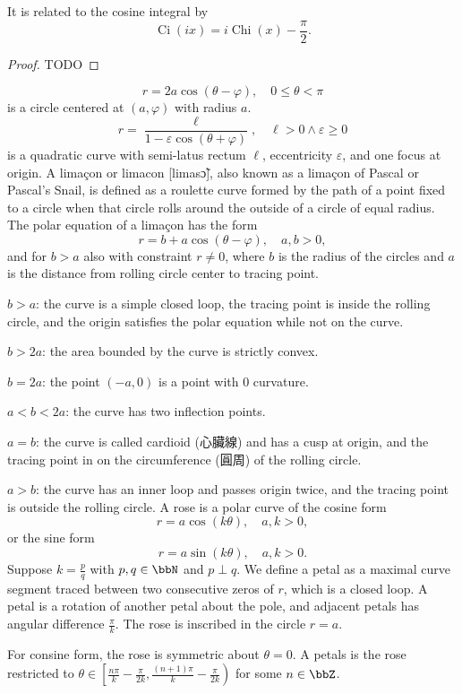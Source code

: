 It is related to the cosine integral by
\[\operatorname{Ci}(ix)=i\operatorname{Chi}(x)-\frac{\pi}{2}.\]
\begin{proof}
TODO
\end{proof}
\[r=2a\cos(\theta-\varphi),\quad 0\le\theta<\pi\]
is a circle centered at $(a,\varphi)$ with radius $a$.
\[r=\frac{\ell}{1-\varepsilon\cos(\theta+\varphi)},\quad\ell>0\land\varepsilon\geq0\]
is a quadratic curve with semi-latus rectum $\ell$, eccentricity $\varepsilon$, and one focus at origin.
A limaçon or limacon [limasɔ̃], also known as a limaçon of Pascal or Pascal's Snail, is defined as a roulette curve formed by the path of a point fixed to a circle when that circle rolls around the outside of a circle of equal radius. The polar equation of a limaçon has the form
\[r=b+a\cos(\theta-\varphi),\quad a,b>0,\]
and for $b>a$ also with constraint $r\neq 0$, where $b$ is the radius of the circles and $a$ is the distance from rolling circle center to tracing point.
\bit
\item $b>a$: the curve is a simple closed loop, the tracing point is inside the rolling circle, and the origin satisfies the polar equation while not on the curve.
\item $b>2a$: the area bounded by the curve is strictly convex.
\item $b=2a$: the point $(-a,0)$ is a point with $0$ curvature.
\item $a<b<2a$: the curve has two inflection points.
\item $a=b$: the curve is called cardioid (心臟線) and has a cusp at origin, and the tracing point in on the circumference (圓周) of the rolling circle.
\item $a>b$: the curve has an inner loop and passes origin twice, and the tracing point is outside the rolling circle.
\eit
{}
A rose is a polar curve of the cosine form
\[r=a\cos(k\theta),\quad a,k>0,\]
or the sine form
\[r=a\sin(k\theta),\quad a,k>0.\]
Suppose $k=\frac{p}{q}$ with $p,q\in\bbN$ and $p\perp q$. We define a petal as a maximal curve segment traced between two consecutive zeros of $r$, which is a closed loop. A petal is a rotation of another petal about the pole, and adjacent petals has angular difference $\frac{\pi}{k}$. The rose is inscribed in the circle $r=a$.
\bit
\item For consine form, the rose is symmetric about $\theta=0$. A petals is the rose restricted to $\theta\in\left.\left[\frac{n\pi}{k}-\frac{\pi}{2k},\frac{(n+1)\pi}{k}-\frac{\pi}{2k}\right.\right)$ for some $n\in\bbZ$.
